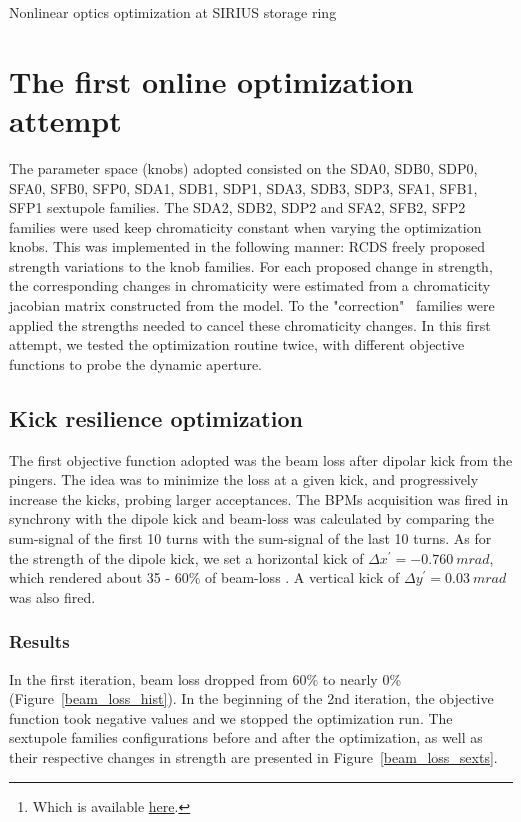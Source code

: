 \documentclass[a4paper,11pt]{article}
\begin{document}
\begin{center}
\LARGE{Nonlinear optics optimization at SIRIUS storage ring}  
\end{center}
\begin{abstract}
This document compiles the results of our attempts at online optimization of SIRIUS nonlinear optics so far. We have applied our own implementation of the Robust Conjugate Direction Search (RCDS)\footnote{Which is available \href{https://github.com/lnls-fac/apsuite/blob/589267dadd42e95b3da0093a8e03f5e7c9ae155d/apsuite/optimization/rcds.py}{here}.} algorithm to optimize the machine Dynamic Aperture (DA) by probing the Injection Efficiency. 
\end{abstract}
\section{The first online optimization attempt}
The parameter space (knobs) adopted consisted on the SDA0, SDB0, SDP0, SFA0, SFB0, SFP0, SDA1, SDB1, SDP1, SDA3, SDB3, SDP3, SFA1, SFB1, SFP1 sextupole families. The SDA2, SDB2, SDP2 and SFA2, SFB2, SFP2 families were used keep chromaticity constant when varying the optimization knobs. This was implemented in the following manner: RCDS freely proposed strength variations to the knob families. For each proposed change in strength, the corresponding changes in chromaticity were estimated from a chromaticity jacobian matrix constructed from the model. To the "correction"~ families were applied the strengths needed to cancel these chromaticity changes. In this first attempt, we tested the optimization routine twice, with different objective functions to probe the dynamic aperture.
\subsection{Kick resilience optimization}
The first objective function adopted was the beam loss after dipolar kick from the pingers. The idea was to minimize the loss at a given kick, and progressively increase the kicks, probing larger acceptances. The BPMs acquisition was fired in synchrony with the dipole kick and beam-loss was calculated by comparing the sum-signal of the first 10 turns with the sum-signal of the last 10 turns. As for the strength of the dipole kick, we set a horizontal kick of $\Delta x^\prime = -0.760~ \unit{m rad}$, which rendered about 35 - 60\% of beam-loss . A vertical kick of $\Delta y^\prime = 0.03~\unit{m rad}$ was also fired.

\subsubsection{Results}
In the first iteration, beam loss dropped from 60\% to nearly 0\% (Figure~\ref{beam_loss_hist}). In the beginning of the 2nd iteration, the objective function took negative values and we stopped the optimization run. The sextupole families configurations before and after the optimization, as well as their respective changes in strength are presented in Figure~\ref{beam_loss_sexts}. 
\end{document}
